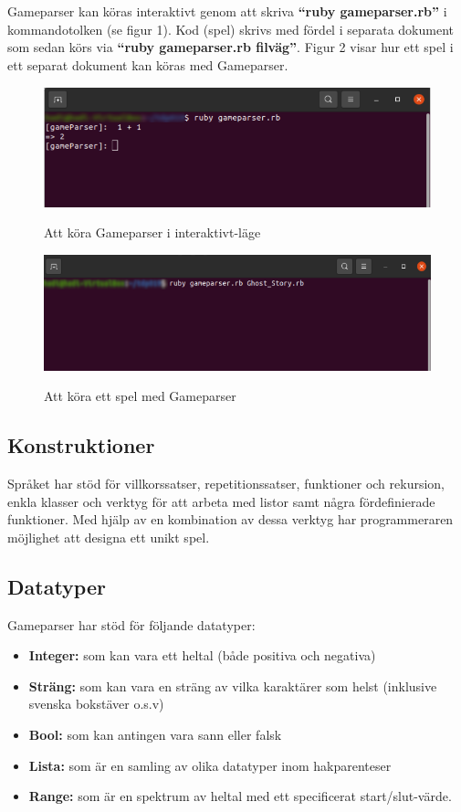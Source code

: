 \documentclass{Dokumentmall}
\begin{document}
Gameparser kan köras interaktivt genom att skriva \textbf{``ruby gameparser.rb''} i kommandotolken (se figur 1). Kod (spel) skrivs med fördel i separata dokument som sedan körs via \textbf{``ruby gameparser.rb filväg''}. Figur 2 visar hur ett spel i ett separat dokument kan köras med Gameparser.
\begin{figure}[h!]
  \centering
  \includegraphics[scale = 0.65]{Images/Figur1.png}
  \label{}
  \caption{Att köra Gameparser i interaktivt-läge}
\end{figure}

\begin{figure}[h!]
  \centering
  \includegraphics[scale = 0.65]{Images/Figur2.png}
  \label{}
  \caption{Att köra ett spel med Gameparser}
\end{figure}

\subsection{Konstruktioner}
Språket har stöd för villkorssatser, repetitionssatser, funktioner och rekursion, enkla klasser och verktyg för att arbeta med listor samt några fördefinierade funktioner. 
Med hjälp av en kombination av dessa verktyg har programmeraren möjlighet att designa ett unikt spel.

\subsection{Datatyper}
Gameparser har stöd för följande datatyper:
\begin{itemize}  
\item \textbf{Integer:} som kan vara ett heltal (både positiva och negativa)
\item \textbf{Sträng:} som kan vara en sträng av vilka karaktärer som helst (inklusive svenska bokstäver o.s.v)
\item \textbf{Bool:} som kan antingen vara sann eller falsk
\item \textbf{Lista:} som är en samling av olika datatyper inom hakparenteser
\item \textbf{Range:} som är en spektrum av heltal med ett specificerat start/slut-värde.
\end{itemize}
\end{document}
